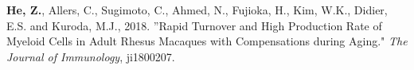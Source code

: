 

\begin{cventries}


  \cventry
    {} %
    {} %
    {} %
    {} %
    {
    \textbf{He, Z.}, Allers, C., Sugimoto, C., Ahmed, N., Fujioka, H., Kim, W.K., Didier, E.S. and Kuroda, M.J., 2018. ''Rapid Turnover and High Production Rate of Myeloid Cells in Adult Rhesus Macaques with Compensations during Aging." \emph{The Journal of Immunology}, ji1800207.
    }

\end{cventries}